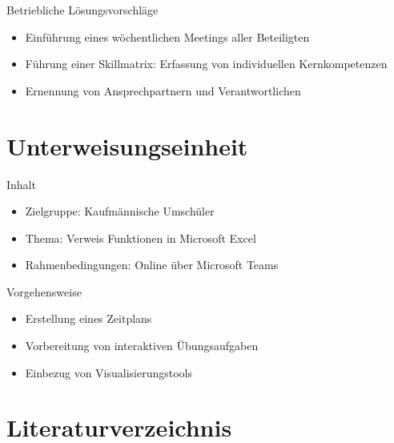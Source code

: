 \documentclass[
  10pt,
  ignorenonframetext,
]{beamer}
\providecommand{\tightlist}{%
  \setlength{\itemsep}{0pt}\setlength{\parskip}{0pt}}
\begin{document}
\begin{frame}{Betriebliche Lösungsvorschläge}
\protect\hypertarget{betriebliche-luxf6sungsvorschluxe4ge}{}
\begin{itemize}
\tightlist
\item
  Einführung eines wöchentlichen Meetings aller Beteiligten
\item
  Führung einer Skillmatrix: Erfassung von individuellen Kernkompetenzen
\item
  Ernennung von Ansprechpartnern und Verantwortlichen
\end{itemize}
\end{frame}

\hypertarget{unterweisungseinheit}{%
\section{Unterweisungseinheit}\label{unterweisungseinheit}}

\begin{frame}{Inhalt}
\protect\hypertarget{inhalt}{}
\begin{itemize}
\tightlist
\item
  Zielgruppe: Kaufmännische Umschüler
\item
  Thema: Verweis Funktionen in Microsoft Excel
\item
  Rahmenbedingungen: Online über Microsoft Teams
\end{itemize}
\end{frame}

\begin{frame}{Vorgehensweise}
\protect\hypertarget{vorgehensweise}{}
\begin{itemize}
\tightlist
\item
  Erstellung eines Zeitplans
\item
  Vorbereitung von interaktiven Übungsaufgaben
\item
  Einbezug von Visualisierungstools
\end{itemize}
\end{frame}

\hypertarget{literaturverzeichnis}{%
\section{Literaturverzeichnis}\label{literaturverzeichnis}}
\end{document}
